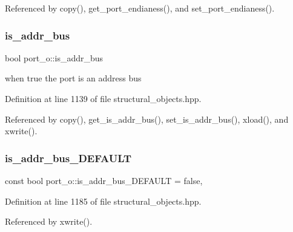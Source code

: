 Referenced by copy(), get\+\_\+port\+\_\+endianess(), and set\+\_\+port\+\_\+endianess().

\mbox{\label{structport__o_a56013273038729a16012452840a8d1b7}} 
\subsubsection{\texorpdfstring{is\+\_\+addr\+\_\+bus}{is\_addr\_bus}}
{\footnotesize\ttfamily bool port\+\_\+o\+::is\+\_\+addr\+\_\+bus\hspace{0.3cm}{\ttfamily [private]}}



when true the port is an address bus 



Definition at line 1139 of file structural\+\_\+objects.\+hpp.



Referenced by copy(), get\+\_\+is\+\_\+addr\+\_\+bus(), set\+\_\+is\+\_\+addr\+\_\+bus(), xload(), and xwrite().

\mbox{\label{structport__o_a22e9e48614ce96593d824beacd370b71}} 
\subsubsection{\texorpdfstring{is\+\_\+addr\+\_\+bus\+\_\+\+D\+E\+F\+A\+U\+LT}{is\_addr\_bus\_DEFAULT}}
{\footnotesize\ttfamily const bool port\+\_\+o\+::is\+\_\+addr\+\_\+bus\+\_\+\+D\+E\+F\+A\+U\+LT = false\hspace{0.3cm}{\ttfamily [static]}, {\ttfamily [private]}}



Definition at line 1185 of file structural\+\_\+objects.\+hpp.



Referenced by xwrite().

\mbox{\label{structport__o_a3bc1e20ec9d3fa89a5561ce5a8d976b1}} 
